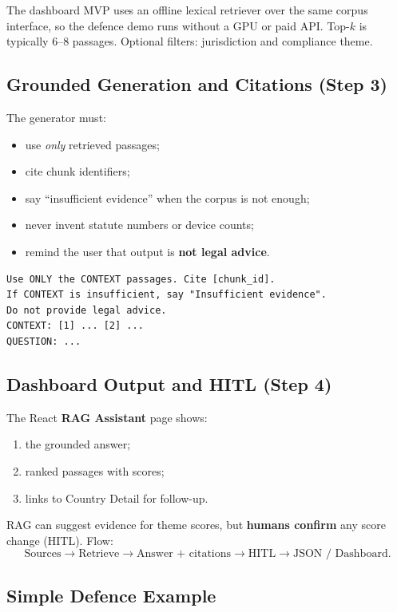 The dashboard MVP uses an offline lexical retriever over the same corpus interface, so
the defence demo runs without a GPU or paid API. Top-$k$ is typically 6--8 passages.
Optional filters: jurisdiction and compliance theme.

\subsection{Grounded Generation and Citations (Step 3)}
\label{sec:rag-prompt}

The generator must:
\begin{itemize}[noitemsep]
  \item use \emph{only} retrieved passages;
  \item cite chunk identifiers;
  \item say ``insufficient evidence'' when the corpus is not enough;
  \item never invent statute numbers or device counts;
  \item remind the user that output is \textbf{not legal advice}.
\end{itemize}

\begin{lstlisting}[caption={Short grounded prompt used by the RAG module},label={lst:prompt}]
Use ONLY the CONTEXT passages. Cite [chunk_id].
If CONTEXT is insufficient, say "Insufficient evidence".
Do not provide legal advice.
CONTEXT: [1] ... [2] ...
QUESTION: ...
\end{lstlisting}

\subsection{Dashboard Output and HITL (Step 4)}
\label{sec:rag-api}

The React \textbf{RAG Assistant} page shows:
\begin{enumerate}[noitemsep]
  \item the grounded answer;
  \item ranked passages with scores;
  \item links to Country Detail for follow-up.
\end{enumerate}

RAG can suggest evidence for theme scores, but \textbf{humans confirm} any score change
(HITL). Flow:
\[
\text{Sources}\rightarrow\text{Retrieve}\rightarrow\text{Answer + citations}
\rightarrow\text{HITL}\rightarrow\text{JSON / Dashboard}.
\]

\subsection{Simple Defence Example}
\label{sec:rag-demo}

